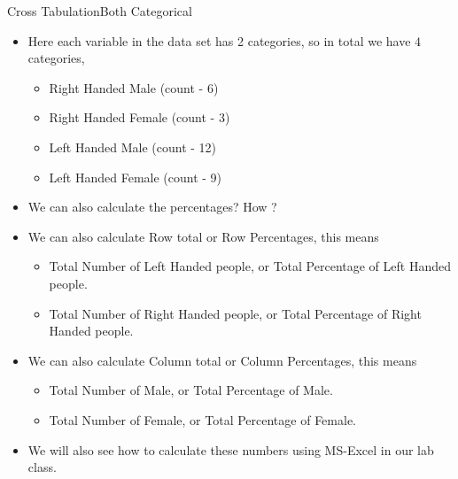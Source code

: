 \documentclass[8pt, usepdftitle=false]{beamer}
\begin{document}
\begin{frame}[allowframebreaks]{Cross Tabulation}{Both Categorical}
\begin{itemize}
\item Here each variable in the data set has 2 categories, so in total we have $4$ categories, 

\begin{itemize}
  \item Right Handed Male (count - 6)
  \item Right Handed Female (count - 3)
  \item Left Handed Male (count - 12)
  \item Left Handed Female (count - 9)
\end{itemize}

\item We can also calculate the percentages? How ?

\item We can also calculate Row total or Row Percentages, this means

\begin{itemize}
  \item Total Number of Left Handed people, or Total Percentage of Left Handed people.
  \item Total Number of Right Handed people, or Total Percentage of Right Handed people.
\end{itemize}

\item We can also calculate Column total or Column Percentages, this means

\begin{itemize}
  \item Total Number of Male, or Total Percentage of Male.
  \item Total Number of Female, or Total Percentage of Female.
\end{itemize}

  
\item We will also see how to calculate these numbers using MS-Excel in our lab class.

\end{itemize}
\end{frame}
\end{document}
